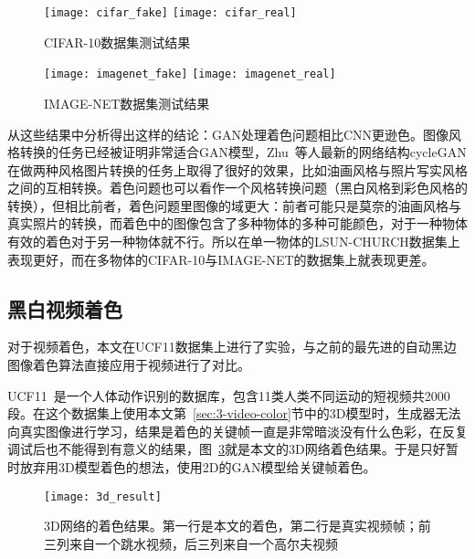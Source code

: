   \begin{figure}[ht]
    \centering
      {\texttt{[image: cifar\_fake]}}
    \hspace{2em}
        {\texttt{[image: cifar\_real]}}
    \caption{CIFAR-10数据集测试结果}
    \label{fig:cifar-compare}
  \end{figure}

  \begin{figure}[ht]
    \centering
      {\texttt{[image: imagenet\_fake]}}
    \hspace{2em}
        {\texttt{[image: imagenet\_real]}}
    \caption{IMAGE-NET数据集测试结果}
    \label{fig:imagenet-compare}
  \end{figure}

  从这些结果中分析得出这样的结论：GAN处理着色问题相比CNN更逊色。图像风格转换的任务已经被证明非常适合GAN模型，Zhu~\cite{DBLP:journals/corr/ZhuPIE17}等人最新的网络结构cycleGAN在做两种风格图片转换的任务上取得了很好的效果，比如油画风格与照片写实风格之间的互相转换。着色问题也可以看作一个风格转换问题（黑白风格到彩色风格的转换），但相比前者，着色问题里图像的域更大：前者可能只是莫奈的油画风格与真实照片的转换，而着色中的图像包含了多种物体的多种可能颜色，对于一种物体有效的着色对于另一种物体就不行。所以在单一物体的LSUN-CHURCH数据集上表现更好，而在多物体的CIFAR-10与IMAGE-NET的数据集上就表现更差。

\subsection{黑白视频着色}
\label{sec:3-video-color-exp}

  对于视频着色，本文在UCF11数据集上进行了实验，与之前的最先进的自动黑边图像着色算法直接应用于视频进行了对比。

  UCF11~\cite{DBLP:conf/cvpr/LiuLS09}是一个人体动作识别的数据库，包含11类人类不同运动的短视频共2000段。在这个数据集上使用本文第~\ref{sec:3-video-color}节中的3D模型时，生成器无法向真实图像进行学习，结果是着色的关键帧一直是非常暗淡没有什么色彩，在反复调试后也不能得到有意义的结果，图~\ref{fig:3d_result}就是本文的3D网络着色结果。于是只好暂时放弃用3D模型着色的想法，使用2D的GAN模型给关键帧着色。

  \begin{figure}[H]
    \centering
    \texttt{[image: 3d\_result]}
    \caption[3D网络着色结果]{3D网络的着色结果。第一行是本文的着色，第二行是真实视频帧；前三列来自一个跳水视频，后三列来自一个高尔夫视频}
    \label{fig:3d_result}
  \end{figure}

